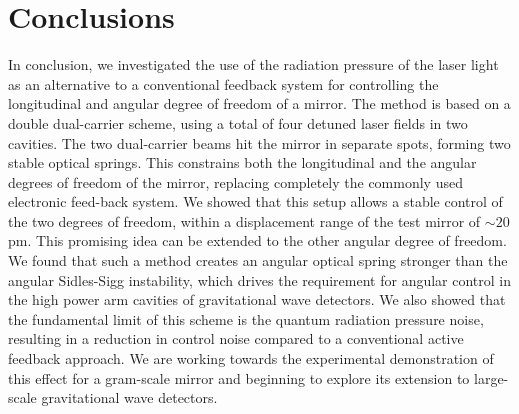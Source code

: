 \section{Conclusions}
In conclusion, we investigated the use of the radiation pressure of the laser light as an alternative to a conventional feedback system for controlling the 
longitudinal and angular degree of freedom of a mirror.
The method is based on a double dual-carrier scheme, using a total of four detuned laser fields in two cavities. 
The two dual-carrier beams hit the mirror in separate spots, forming two stable optical springs.
This constrains both the longitudinal and the angular degrees of freedom of the mirror, replacing completely the commonly used electronic feed-back system.
We showed that this setup allows a stable control of the two degrees of freedom, within a displacement range of the test mirror of $\sim 20\,$pm. This promising idea can be extended to the other angular degree of freedom.
We found that such a method creates an angular optical spring stronger than the angular Sidles-Sigg instability, which drives the requirement for angular control in the high power arm cavities of gravitational wave detectors. We also showed that the fundamental limit of this scheme is the quantum radiation pressure noise, resulting in a reduction in control noise compared to a conventional active feedback approach. 
We are working towards the experimental demonstration of this effect for a gram-scale mirror and beginning to explore its extension
to large-scale gravitational wave detectors.


